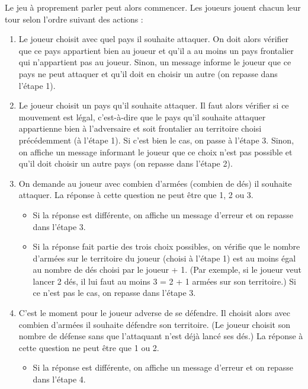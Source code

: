 \vspace{0.3cm}
Le jeu à proprement parler peut alors commencer. Les joueurs jouent chacun leur tour selon l'ordre suivant des actions :
\begin{enumerate}
    \item Le joueur choisit avec quel pays il souhaite attaquer. On doit alors vérifier que ce pays appartient bien au joueur et qu'il a au moins un pays frontalier qui n'appartient pas au joueur. Sinon, un message informe le joueur que ce pays ne peut attaquer et qu'il doit en choisir un autre (on repasse dans l'étape 1).
    \vspace{0.2cm}
    \item Le joueur choisit un pays qu'il souhaite attaquer. Il faut alors vérifier si ce mouvement est légal, c'est-à-dire que le pays qu'il souhaite attaquer appartienne bien à l'adversaire et soit frontalier au territoire choisi précédemment (à l'étape 1). Si c'est bien le cas, on passe à l'étape 3. Sinon, on affiche un message informant le joueur que ce choix n'est pas possible et qu'il doit choisir un autre pays (on repasse dans l'étape 2).
    \vspace{0.2cm}
    \item On demande au joueur avec combien d'armées (combien de dés) il souhaite attaquer. La réponse à cette question ne peut être que 1, 2 ou 3.
    \begin{itemize}
        \item Si la réponse est différente, on affiche un message d'erreur et on repasse dans l'étape 3.
        \item Si la réponse fait partie des trois choix possibles, on vérifie que le nombre d'armées sur le territoire du joueur (choisi à l'étape 1) est au moins égal au nombre de dés choisi par le joueur + 1. (Par exemple, si le joueur veut lancer 2 dés, il lui faut au moins 3 = 2 + 1 armées sur son territoire.) Si ce n'est pas le cas, on repasse dans l'étape 3.
    \end{itemize}
    \vspace{0.2cm}
    \item C'est le moment pour le joueur adverse de se défendre. Il choisit alors avec combien d'armées il souhaite défendre son territoire. (Le joueur choisit son nombre de défense sans que l'attaquant n'est déjà lancé ses dés.) La réponse à cette question ne peut être que 1 ou 2. 
    \begin{itemize}
        \item Si la réponse est différente, on affiche un message d'erreur et on repasse dans l'étape 4.

\end{itemize}
\end{enumerate}
